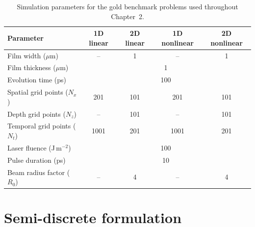 \begin{table}[htbp]
    \centering
    \caption{Simulation parameters for the gold benchmark problems used throughout Chapter~2.}
    \label{tab:ch2-params}
    \small
    \begin{tabular}{@{}lcccc@{}}
        \toprule
        \rowcolor{gray!20}
        \textbf{Parameter}           & \textbf{1D linear}      & \textbf{2D linear} & \textbf{1D nonlinear} & \textbf{2D nonlinear} \\
        \midrule
        Film width ($\mu$m)          & --                      & 1                  & --                    & 1                     \\
        Film thickness ($\mu$m)      & \multicolumn{4}{c}{1}                                                                        \\
        Evolution time (ps)          & \multicolumn{4}{c}{100}                                                                      \\
        Spatial grid points ($N_x$)  & 201                     & 101                & 201                   & 101                   \\
        Depth grid points ($N_z$)    & --                      & 101                & --                    & 101                   \\
        Temporal grid points ($N_t$) & 1001                    & 201                & 1001                  & 201                   \\
        Laser fluence (J\,m$^{-2}$)  & \multicolumn{4}{c}{100}                                                                      \\
        Pulse duration (ps)          & \multicolumn{4}{c}{10}                                                                       \\
        Beam radius factor ($R_0$)   & --                      & 4                  & --                    & 4                     \\
        \bottomrule
    \end{tabular}
\end{table}

\section{Semi-discrete formulation}
\label{sec:ch2-semidiscrete}

